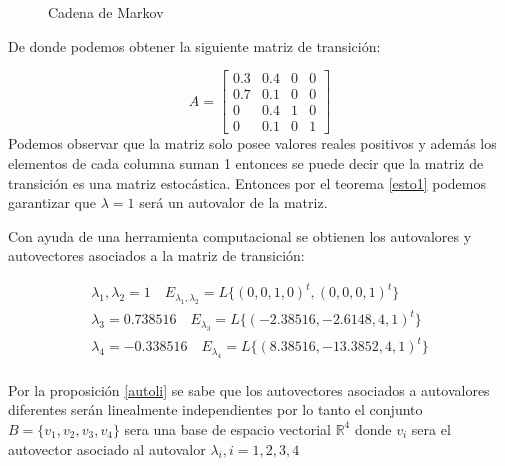 \begin{figure}[htb]
\centering
{}
\caption{Cadena de Markov}

\end{figure}

De donde podemos obtener la siguiente matriz de transición:

\[
    A = 
    \left[
        \begin{array}{cccc}
            0.3 & 0.4 & 0 & 0 \\
            0.7 & 0.1 & 0 & 0 \\
            0 & 0.4 & 1 & 0 \\
            0 & 0.1 & 0 & 1
        \end{array}
    \right]
\]
Podemos observar que la matriz solo posee valores reales positivos y además los elementos de cada columna suman 1 entonces se puede decir que la matriz de transición es una matriz estocástica. Entonces por el teorema \ref{esto1} podemos garantizar que $\lambda = 1$ será un autovalor de la matriz.

Con ayuda de una herramienta computacional se obtienen los autovalores y autovectores asociados a la matriz de transición:

\begin{gather*}
    \lambda_1,\lambda_2 = 1 \quad E_{\lambda_1,\lambda_2} = L\{(0,0,1,0)^t,(0,0,0,1)^t\}\\
    \lambda_3 = 0.738516 \quad E_{\lambda_3} = L\{(-2.38516,-2.6148,4,1)^t\}\\
    \lambda_4 = -0.338516 \quad E_{\lambda_4} = L\{(8.38516,-13.3852,4,1)^t\}\\
\end{gather*}

Por la proposición \ref{autoli} se sabe que los autovectores asociados a autovalores diferentes serán linealmente independientes por lo tanto el conjunto $B = \{v_1,v_2,v_3,v_4\}$ sera una base de espacio vectorial $\mathbb{R}^4$ donde $v_i$ sera el autovector asociado al autovalor $\lambda_i, i = 1,2,3,4$


